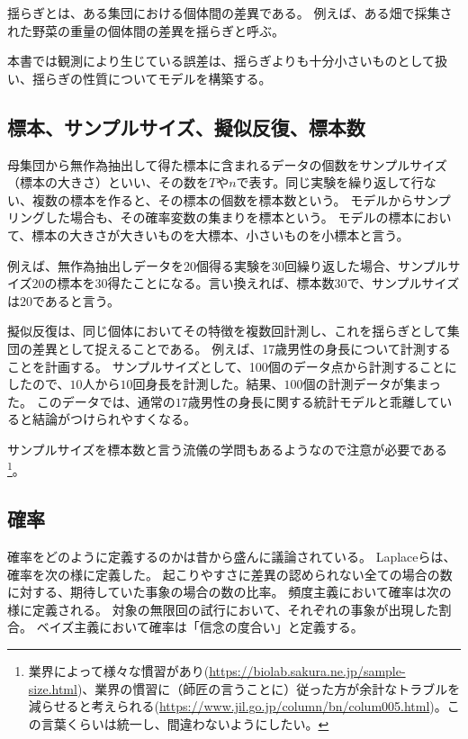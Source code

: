 揺らぎとは、ある集団における個体間の差異である。
例えば、ある畑で採集された野菜の重量の個体間の差異を揺らぎと呼ぶ。

本書では観測により生じている誤差は、揺らぎよりも十分小さいものとして扱い、揺らぎの性質についてモデルを構築する。

\subsection{標本、サンプルサイズ、擬似反復、標本数}
\begin{defi}
母集団から無作為抽出して得た標本に含まれるデータの個数をサンプルサイズ（標本の大きさ）といい、その数を$T$や$n$で表す。同じ実験を繰り返して行ない、複数の標本を作ると、その標本の個数を標本数という。
モデルからサンプリングした場合も、その確率変数の集まりを標本という。
モデルの標本において、標本の大きさが大きいものを大標本、小さいものを小標本と言う。
\end{defi}
例えば、無作為抽出しデータを$20$個得る実験を30回繰り返した場合、サンプルサイズ$20$の標本を$30$得たことになる。言い換えれば、標本数$30$で、サンプルサイズは$20$であると言う。


擬似反復は、同じ個体においてその特徴を複数回計測し、これを揺らぎとして集団の差異として捉えることである。
例えば、17歳男性の身長について計測することを計画する。
サンプルサイズとして、100個のデータ点から計測することにしたので、$10$人から$10$回身長を計測した。結果、$100$個の計測データが集まった。
このデータでは、通常の$17$歳男性の身長に関する統計モデルと乖離していると結論がつけられやすくなる。



サンプルサイズを標本数と言う流儀の学問もあるようなので注意が必要である
\footnote{業界によって様々な慣習があり(\url{https://biolab.sakura.ne.jp/sample-size.html})、業界の慣習に（師匠の言うことに）従った方が余計なトラブルを減らせると考えられる(\url{https://www.jil.go.jp/column/bn/colum005.html})。この言葉くらいは統一し、間違わないようにしたい。}。


\subsection{確率}
確率をどのように定義するのかは昔から盛んに議論されている。
Laplaceらは、確率を次の様に定義した。
起こりやすさに差異の認められない全ての場合の数に対する、期待していた事象の場合の数の比率。
頻度主義において確率は次の様に定義される。
対象の無限回の試行において、それぞれの事象が出現した割合。
ベイズ主義において確率は「信念の度合い」と定義する。

